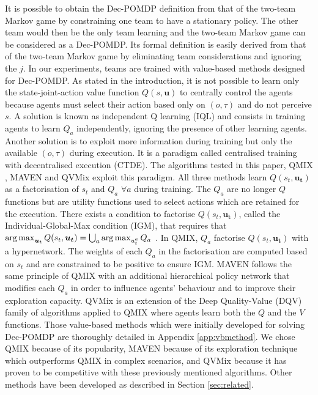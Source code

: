 It is possible to obtain the Dec-POMDP \citep{DecPomdp} definition from that of the two-team Markov game by constraining one team to have a stationary policy.
The other team would then be the only team learning and the two-team Markov game can be considered as a Dec-POMDP.
Its formal definition is easily derived from that of the two-team Markov game by eliminating team considerations and ignoring the $j$.
In our experiments, teams are trained with value-based methods designed for Dec-POMDP.
As stated in the introduction, it is not possible to learn only the state-joint-action value function $Q(s,\mathbf{u})$ to centrally control the agents because agents must select their action based only on $(o, \tau)$ and do not perceive $s$.
A solution is known as independent Q learning (IQL) \citep{Tan1993} and consists in training agents to learn $Q_a$ independently, ignoring the presence of other learning agents.
Another solution is to exploit more information during training but only the available $(o, \tau)$ during execution.
It is a paradigm called centralised training with decentralised execution (CTDE).
The algorithms tested in this paper, QMIX \citep{Rashid2018}, MAVEN \citep{Mahajan2019MAVEN:Exploration} and QVMix \citep{leroy2020qvmix} exploit this paradigm.
All three methods learn $Q(s_t,\mathbf{u_t})$ as a factorisation of $s_t$ and $Q_a$ $\forall a$ during training.
The $Q_a$ are no longer $Q$ functions but are utility functions used to select actions which are retained for the execution.
There exists a condition to factorise $Q(s_t,\mathbf{u_t})$, called the Individual-Global-Max condition (IGM), that requires that $\argmax_{\mathbf{u_t}} Q(s_t, \mathbf{u_t}) =\bigcup_{a}\argmax_{u_t^{a}} Q_{a}$ \citep{Son2019QTRAN:Learning}.
In QMIX, $Q_a$ factorise $Q(s_t,\mathbf{u_t})$ with a hypernetwork.
The weights of each $Q_a$ in the factorisation are computed based on $s_t$ and are constrained to be positive to ensure IGM.
MAVEN follows the same principle of QMIX with an additional hierarchical policy network that modifies each $Q_a$ in order to influence agents' behaviour and to improve their exploration capacity.
QVMix is an extension of the Deep Quality-Value (DQV) family of algorithms \citep{sabatelli2018deepQV,sabatelli2020deep} applied to QMIX where agents learn both the $Q$ and the $V$ functions.
Those value-based methods which were initially developed for solving Dec-POMDP are thoroughly detailed in Appendix \ref{app:vbmethod}.
We chose QMIX because of its popularity, MAVEN because of its exploration technique which outperforms QMIX in complex scenarios, and QVMix because it has proven to be competitive with these previously mentioned algorithms.
Other methods have been developed as described in Section \ref{sec:related}.

